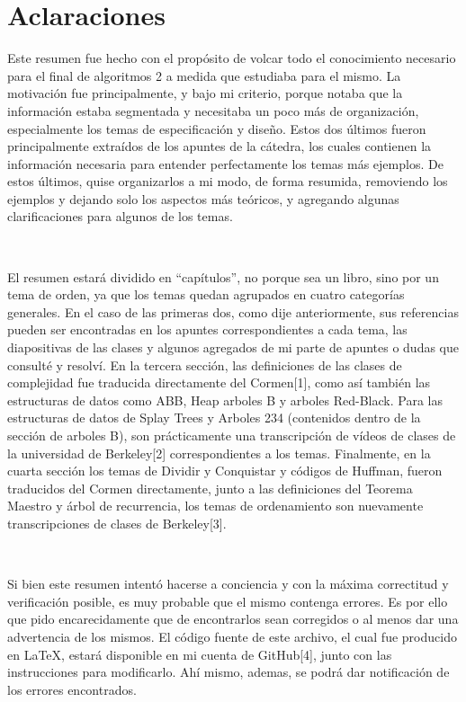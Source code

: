 \documentclass[10pt, a4paper]{report}
\begin{document}
\newpage

\chapter*{Aclaraciones}

Este resumen fue hecho con el prop\'osito de volcar todo el conocimiento necesario para el final de algoritmos 2 a medida que estudiaba para el mismo. La motivaci\'on fue principalmente, y bajo mi criterio, porque notaba que la informaci\'on estaba segmentada y necesitaba un poco m\'as de organizaci\'on, especialmente los temas de especificaci\'on y dise\~no. Estos dos \'ultimos fueron principalmente extra\'idos de los apuntes de la c\'atedra, los cuales contienen la informaci\'on necesaria para entender perfectamente los temas m\'as ejemplos. De estos \'ultimos, quise organizarlos a mi modo, de forma resumida, removiendo los ejemplos y dejando solo los aspectos m\'as te\'oricos, y agregando algunas clarificaciones para algunos de los temas.

~

El resumen estar\'a dividido en ``cap\'itulos'', no porque sea un libro, sino por un tema de orden, ya que los temas quedan agrupados en cuatro categor\'ias generales. En el caso de las primeras dos, como dije anteriormente, sus referencias pueden ser encontradas en los apuntes correspondientes a cada tema, las diapositivas de las clases y algunos agregados de mi parte de apuntes o dudas que consult\'e y resolv\'i. En la tercera secci\'on, las definiciones de las clases de complejidad fue traducida directamente del Cormen[1], como as\'i tambi\'en las estructuras de datos como ABB, Heap arboles B y arboles Red-Black. Para las estructuras de datos de Splay Trees y Arboles 234 (contenidos dentro de la secci\'on de arboles B), son pr\'acticamente una transcripci\'on de v\'ideos de clases de la universidad de Berkeley[2] correspondientes a los temas. Finalmente, en la cuarta secci\'on los temas de Dividir y Conquistar y c\'odigos de Huffman, fueron traducidos del Cormen directamente, junto a las definiciones del Teorema Maestro y \'arbol de recurrencia, los temas de ordenamiento son nuevamente transcripciones de clases de Berkeley[3].

~

Si bien este resumen intent\'o hacerse a conciencia y con la m\'axima correctitud y verificaci\'on posible, es muy probable que el mismo contenga errores. Es por ello que pido encarecidamente que de encontrarlos sean corregidos o al menos dar una advertencia de los mismos. El c\'odigo fuente de este archivo, el cual fue producido en LaTeX, estar\'a disponible en mi cuenta de GitHub[4], junto con las instrucciones para modificarlo. Ah\'i mismo, ademas, se podr\'a dar notificaci\'on de los errores encontrados.
\end{document}
